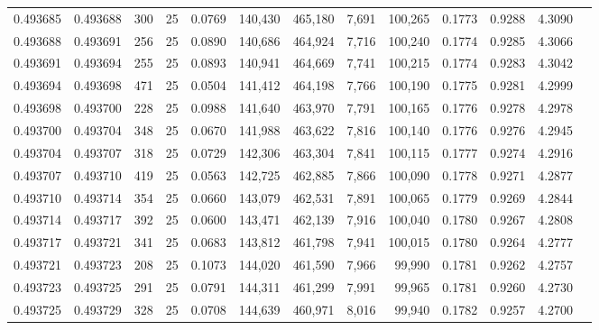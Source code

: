 \begin{tabular}{rrrrrrrrrrrrr}
0.493685 & 0.493688 &   300 &  25 &                                     0.0769 & 140,430 & 465,180 &   7,691 & 100,265 & 0.1773 & 0.9288 & 4.3090 \\
0.493688 & 0.493691 &   256 &  25 &                                     0.0890 & 140,686 & 464,924 &   7,716 & 100,240 & 0.1774 & 0.9285 & 4.3066 \\
0.493691 & 0.493694 &   255 &  25 &                                     0.0893 & 140,941 & 464,669 &   7,741 & 100,215 & 0.1774 & 0.9283 & 4.3042 \\
0.493694 & 0.493698 &   471 &  25 &                                     0.0504 & 141,412 & 464,198 &   7,766 & 100,190 & 0.1775 & 0.9281 & 4.2999 \\
0.493698 & 0.493700 &   228 &  25 &                                     0.0988 & 141,640 & 463,970 &   7,791 & 100,165 & 0.1776 & 0.9278 & 4.2978 \\
0.493700 & 0.493704 &   348 &  25 &                                     0.0670 & 141,988 & 463,622 &   7,816 & 100,140 & 0.1776 & 0.9276 & 4.2945 \\
0.493704 & 0.493707 &   318 &  25 &                                     0.0729 & 142,306 & 463,304 &   7,841 & 100,115 & 0.1777 & 0.9274 & 4.2916 \\
0.493707 & 0.493710 &   419 &  25 &                                     0.0563 & 142,725 & 462,885 &   7,866 & 100,090 & 0.1778 & 0.9271 & 4.2877 \\
0.493710 & 0.493714 &   354 &  25 &                                     0.0660 & 143,079 & 462,531 &   7,891 & 100,065 & 0.1779 & 0.9269 & 4.2844 \\
0.493714 & 0.493717 &   392 &  25 &                                     0.0600 & 143,471 & 462,139 &   7,916 & 100,040 & 0.1780 & 0.9267 & 4.2808 \\
0.493717 & 0.493721 &   341 &  25 &                                     0.0683 & 143,812 & 461,798 &   7,941 & 100,015 & 0.1780 & 0.9264 & 4.2777 \\
0.493721 & 0.493723 &   208 &  25 &                                     0.1073 & 144,020 & 461,590 &   7,966 &  99,990 & 0.1781 & 0.9262 & 4.2757 \\
0.493723 & 0.493725 &   291 &  25 &                                     0.0791 & 144,311 & 461,299 &   7,991 &  99,965 & 0.1781 & 0.9260 & 4.2730 \\
0.493725 & 0.493729 &   328 &  25 &                                     0.0708 & 144,639 & 460,971 &   8,016 &  99,940 & 0.1782 & 0.9257 & 4.2700 \\

\end{tabular}
